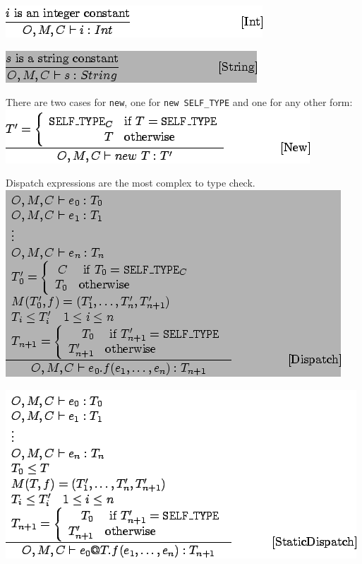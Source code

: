 \documentclass[]{article}
\begin{document}
\includegraphics{img80.png}

\includegraphics{img81.png}

There are two cases for \texttt{new}, one for \texttt{new SELF\_TYPE}
and one for any other form: \\

\includegraphics{img82.png}

Dispatch expressions are the most complex to type check. \\

\includegraphics{img83.png}

\includegraphics{img84.png}
\end{document}
